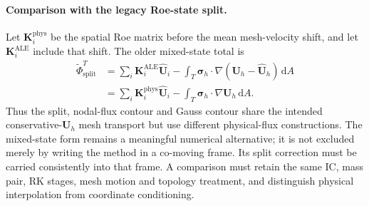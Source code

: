 \paragraph{Comparison with the legacy Roe-state split.}
Let $\mathbf K_i^{\mathrm{phys}}$ be the spatial Roe matrix before the
mean mesh-velocity shift, and let $\mathbf K_i^{\mathrm{ALE}}$ include
that shift. The older mixed-state total is
\begin{align}
 \widetilde\Phi_{\mathrm{split}}^T
 &=\sum_i\mathbf K_i^{\mathrm{ALE}}\widehat{\mathbf U}_i
 -\int_T\boldsymbol\sigma_h\cdot
       \nabla(\mathbf U_h-\widehat{\mathbf U}_h)\,\mathrm dA
 \nonumber\\
 &=\sum_i\mathbf K_i^{\mathrm{phys}}\widehat{\mathbf U}_i
 -\int_T\boldsymbol\sigma_h\cdot\nabla\mathbf U_h\,\mathrm dA.
 \label{eq:ALE_RD_Gauss_legacy_split_comparison}
\end{align}
Thus the split, nodal-flux contour and Gauss contour share the intended
conservative-$\mathbf U_h$ mesh transport but use different physical-flux
constructions. The mixed-state form remains a meaningful numerical
alternative; it is not excluded merely by writing the method in a
co-moving frame. Its split correction must be carried consistently into
that frame. A comparison must retain the same IC, mass pair, RK stages,
mesh motion and topology treatment, and distinguish physical interpolation
from coordinate conditioning.


